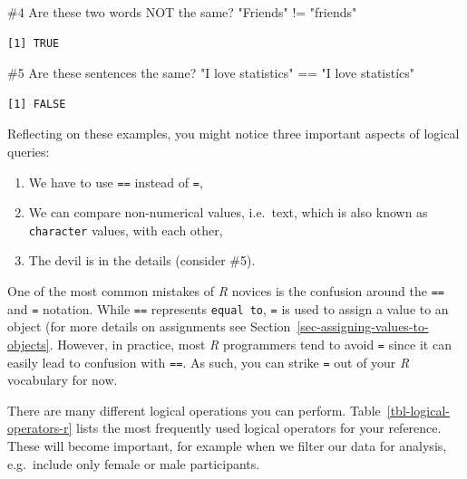 \documentclass[
  letterpaper,
  DIV=11,
  numbers=noendperiod]{scrreprt}
\newenvironment{Shaded}{\begin{snugshade}}{\end{snugshade}}
\newcommand{\CommentTok}[1]{\textcolor[rgb]{0.37,0.37,0.37}{#1}}
\newcommand{\SpecialCharTok}[1]{\textcolor[rgb]{0.37,0.37,0.37}{#1}}
\newcommand{\StringTok}[1]{\textcolor[rgb]{0.13,0.47,0.30}{#1}}
\providecommand{\tightlist}{%
  \setlength{\itemsep}{0pt}\setlength{\parskip}{0pt}}\usepackage{longtable,booktabs,array}
\begin{document}
\begin{Shaded}
\begin{Highlighting}[]
\CommentTok{\#4 Are these two words NOT the same?}
\StringTok{"Friends"} \SpecialCharTok{!=} \StringTok{"friends"}
\end{Highlighting}
\end{Shaded}

\begin{verbatim}
[1] TRUE
\end{verbatim}

\begin{Shaded}
\begin{Highlighting}[]
\CommentTok{\#5 Are these sentences the same?}
\StringTok{"I love statistics"} \SpecialCharTok{==} \StringTok{"I love statistícs"}
\end{Highlighting}
\end{Shaded}

\begin{verbatim}
[1] FALSE
\end{verbatim}

Reflecting on these examples, you might notice three important aspects
of logical queries:

\begin{enumerate}
\def\labelenumi{\arabic{enumi}.}
\tightlist
\item
  We have to use \texttt{==} instead of \texttt{=},
\item
  We can compare non-numerical values, i.e.~text, which is also known as
  \texttt{character} values, with each other,
\item
  The devil is in the details (consider \#5).
\end{enumerate}

One of the most common mistakes of \emph{R} novices is the confusion
around the \texttt{==} and \texttt{=} notation. While \texttt{==}
represents \texttt{equal\ to}, \texttt{=} is used to assign a value to
an object (for more details on assignments see
Section~\ref{sec-assigning-values-to-objects}. However, in practice,
most \emph{R} programmers tend to avoid \texttt{=} since it can easily
lead to confusion with \texttt{==}. As such, you can strike \texttt{=}
out of your \emph{R} vocabulary for now.

There are many different logical operations you can perform.
Table~\ref{tbl-logical-operators-r} lists the most frequently used
logical operators for your reference. These will become important, for
example when we filter our data for analysis, e.g.~include only female
or male participants.
\end{document}
